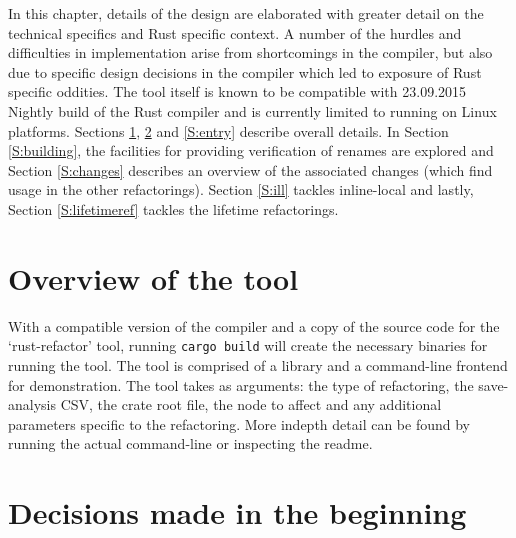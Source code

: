 In this chapter, details of the design are elaborated with greater detail on the technical specifics and Rust specific context. A number of the hurdles and difficulties in implementation arise from shortcomings in the compiler, but also due to specific design decisions in the compiler which led to exposure of Rust specific oddities. The tool itself is known to be compatible with 23.09.2015 Nightly build of the Rust compiler and is currently limited to running on Linux platforms. Sections \ref{S:iover}, \ref{S:begin} and \ref{S:entry} describe overall details. In Section \ref{S:building}, the facilities for providing verification of renames are explored and Section \ref{S:changes} describes an overview of the associated changes (which find usage in the other refactorings). Section \ref{S:ill} tackles inline-local and lastly, Section \ref{S:lifetimeref} tackles the lifetime refactorings.



\section{Overview of the tool}\label{S:iover}
With a compatible version of the compiler and a copy of the source code for the `rust-refactor' tool, running {\verb|cargo build|} will create the necessary binaries for running the tool. The tool is comprised of a library and a command-line frontend for demonstration. The tool takes as arguments: the type of refactoring, the save-analysis CSV, the crate root file, the node to affect and any additional parameters specific to the refactoring. More indepth detail can be found by running the actual command-line or inspecting the readme.

\section{Decisions made in the beginning}\label{S:begin}
